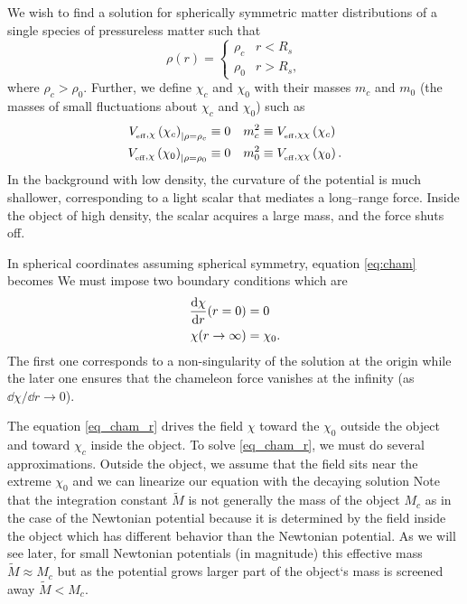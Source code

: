 We wish to find a solution for spherically symmetric matter distributions of a single species of pressureless matter such that
\begin{equation*}
\rho(r)=
\begin{cases}
\rho_c & r<R_s \\
\rho_0 & r>R_s,
\end{cases}
\end{equation*}
where $\rho_c>\rho_0$. Further, we define $\chi_c$ and $\chi_0$ with their masses $m_c$ and $m_0$ (the masses of small fluctuations about $\chi_c$ and $\chi_0$) such as
\begin{align*}
V_{_\text{\tiny eff},\chi}\left(\chi_c\right)_{|\rho=\rho_c}&\equiv0	&	m^2_c&\equiv V_{_\text{\tiny eff},\chi\chi}\left(\chi_c\right) \\
V_{_\text{\tiny eff},\chi}\left(\chi_0\right)_{|\rho=\rho_0}&\equiv0	&	m^2_0&\equiv V_{_\text{\tiny eff},\chi\chi}\left(\chi_0\right).
\end{align*}
In the background with low density, the curvature of the potential is much shallower, corresponding to a light scalar that mediates a long--range force. Inside the object of high density, the scalar acquires a large mass, and the force shuts off.

In spherical coordinates assuming spherical symmetry, equation \eqref{eq:cham} becomes
We must impose two boundary conditions which are
\begin{align*}
\frac{\mbox{d} \chi}{\mbox{d} r}(r=0)&=0 \\
\chi(r\rightarrow\infty)&=\chi_0.
\end{align*}
The first one corresponds to a non-singularity of the solution at the origin while the later one ensures that the chameleon force vanishes at the infinity (as $\dd\chi/\dd r\rightarrow0$).

The equation \eqref{eq_cham_r} drives the field $\chi$ toward the $\chi_0$ outside the object and toward $\chi_c$ inside the object. To solve \eqref{eq_cham_r}, we must do several approximations. Outside the object, we assume that the field sits near the extreme $\chi_0$ and we can linearize our equation
with the decaying solution
Note that the integration constant $\tilde{M}$ is not generally the mass of the object $M_c$ as in the case of the Newtonian potential because it is determined by the field inside the object which has different behavior than the Newtonian potential. As we will see later, for small Newtonian potentials (in magnitude) this effective mass $\tilde{M}\approx M_c$ but as the potential grows larger part of the object`s mass is screened away $\tilde{M}< M_c$.

